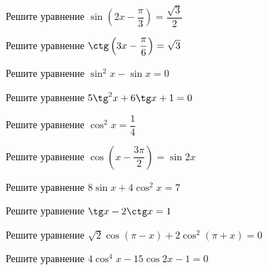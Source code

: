 \begin{consultation}
	\begin{listofex}
		\item  Решите уравнение \( \sin\left( 2x-\dfrac{\pi}{3} \right)=\dfrac{\sqrt{3}}{2} \)
		\item  Решите уравнение \( \ctg\left( 3x-\dfrac{\pi}{6} \right)=\sqrt{3} \)
		\item  Решите уравнение \( \sin^2x-\sin x=0 \)
		\item  Решите уравнение \( 5\tg^2x+6\tg x+1=0 \)
		\item  Решите уравнение \( \cos^2x=\dfrac{1}{4} \)
		\item  Решите уравнение \( \cos {\left(x - \dfrac{3\pi}{2}\right)} = \sin 2x \)
		\item  Решите уравнение \( 8\sin x + 4\cos^2 x = 7 \)
		\item  Решите уравнение \( \tg x-2\ctg x=1 \)
		\item  Решите уравнение \( \sqrt{2}\cos {(\pi-x)} + 2\cos^2{(\pi+x)}=0 \)
		\item  Решите уравнение \( 4\cos^4 x - 15\cos 2x -1= 0 \)
	\end{listofex}
\end{consultation}

